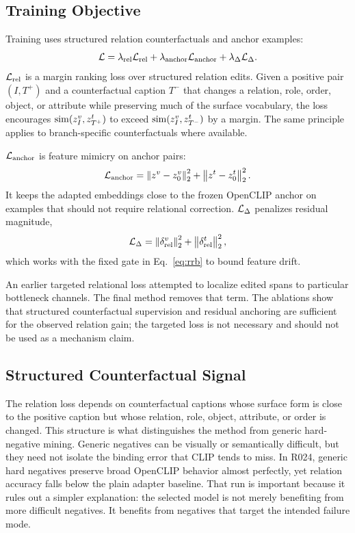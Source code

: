 \subsection{Training Objective}

Training uses structured relation counterfactuals and anchor examples:
\begin{equation}
    \mathcal{L} =
    \lambda_{\mathrm{rel}}\mathcal{L}_{\mathrm{rel}}
    + \lambda_{\mathrm{anchor}}\mathcal{L}_{\mathrm{anchor}}
    + \lambda_{\Delta}\mathcal{L}_{\Delta} .
    \label{eq:loss}
\end{equation}
$\mathcal{L}_{\mathrm{rel}}$ is a margin ranking loss over structured relation edits. Given a positive pair $(I,T^+)$ and a counterfactual caption $T^-$ that changes a relation, role, order, object, or attribute while preserving much of the surface vocabulary, the loss encourages $\mathrm{sim}(z^v_I,z^t_{T^+})$ to exceed $\mathrm{sim}(z^v_I,z^t_{T^-})$ by a margin. The same principle applies to branch-specific counterfactuals where available.

$\mathcal{L}_{\mathrm{anchor}}$ is feature mimicry on anchor pairs:
\begin{equation}
    \mathcal{L}_{\mathrm{anchor}} =
    \left\|z^v - z_0^v\right\|_2^2 +
    \left\|z^t - z_0^t\right\|_2^2 .
\end{equation}
It keeps the adapted embeddings close to the frozen OpenCLIP anchor on examples that should not require relational correction. $\mathcal{L}_{\Delta}$ penalizes residual magnitude,
\begin{equation}
    \mathcal{L}_{\Delta} = \left\|\delta_{\mathrm{rel}}^v\right\|_2^2 + \left\|\delta_{\mathrm{rel}}^t\right\|_2^2,
\end{equation}
which works with the fixed gate in Eq.~\ref{eq:rrb} to bound feature drift.

An earlier targeted relational loss attempted to localize edited spans to particular bottleneck channels. The final method removes that term. The ablations show that structured counterfactual supervision and residual anchoring are sufficient for the observed relation gain; the targeted loss is not necessary and should not be used as a mechanism claim.

\subsection{Structured Counterfactual Signal}

The relation loss depends on counterfactual captions whose surface form is close to the positive caption but whose relation, role, object, attribute, or order is changed. This structure is what distinguishes the method from generic hard-negative mining. Generic negatives can be visually or semantically difficult, but they need not isolate the binding error that CLIP tends to miss. In R024, generic hard negatives preserve broad OpenCLIP behavior almost perfectly, yet relation accuracy falls below the plain adapter baseline. That run is important because it rules out a simpler explanation: the selected model is not merely benefiting from more difficult negatives. It benefits from negatives that target the intended failure mode.

